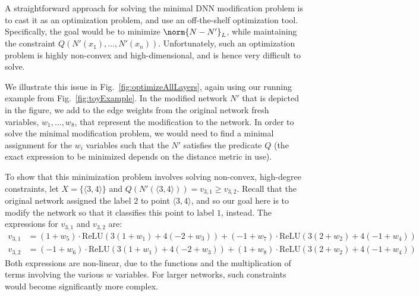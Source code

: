 \documentclass{easychair}
\newcommand{\relu}{\text{ReLU}\xspace{}}
\begin{document}
A straightforward approach for solving the minimal DNN modification
problem is to cast it as an optimization problem, and use an
off-the-shelf optimization tool. Specifically, the goal would be to
minimize $\norm{N-N'}_L$, while maintaining the constraint
$Q(N'(x_1),\ldots, N'(x_n))$. Unfortunately, such an optimization
problem is highly non-convex and high-dimensional, and is hence very
difficult to solve.

We illustrate this issue in Fig.~\ref{fig:optimizeAllLayers}, again using
our running example from Fig.~\ref{fig:toyExample}. In the modified network
$N'$ that is depicted in the figure, we add to the edge weights from
the original network fresh variables, 
$w_1,\ldots,w_8$, that represent the modification to the network. In
order to solve the minimal modification problem, we would
need to find a minimal assignment for the $w_i$ variables
such that the $N'$ satisfies the predicate $Q$
(the exact expression to be minimized
depends on the distance metric in use).

To show that this minimization problem involves solving non-convex,
high-degree constraints, let $X=\{\langle 3, 4\rangle\}$ and
$Q(N'(\langle 3,4\rangle))=v_{3,1}\geq v_{3,2}$. Recall that the
original network assigned the label $2$ to point $\langle 3,4\rangle$,
and so our goal here is to modify the network so that it classifies
this point to label $1$, instead.  The expressions for $v_{3,1}$ and
$v_{3,2}$ are:
\begin{align*}
  v_{3,1}&=
  (1+w_5)\cdot  \relu{}(3(1+w_1)+4(-2+w_3))
  +
  (-1+w_7)\cdot \relu{}(3(2+w_2)+4(-1+w_4))
  \\
  v_{3,2}&=
  (-1+w_6)\cdot \relu{}(3(1+w_1)+4(-2+w_3))
  +
  (1+w_8) \cdot \relu{}(3(2+w_2)+4(-1+w_4))
\end{align*}
Both expressions are non-linear, due to the \relu{} functions and the
multiplication of terms involving the various $w$ variables.
For larger networks, such constraints would become significantly more complex.
\end{document}
